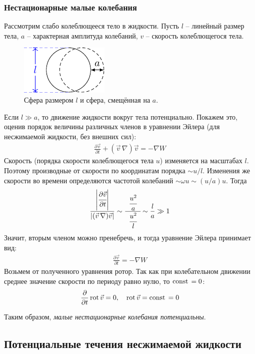\subsubsection{Нестационарные малые колебания}
Рассмотрим слабо колеблющееся тело в жидкости. Пусть $l$ -- линейный размер тела, $a$ -- характерная амплитуда колебаний, $v$ -- скорость колеблющегося тела.
\begin{figure}[H]
	\centering
	\includegraphics[scale=1.5]{img/sphere}
	\caption{Сфера размером $l$ и сфера, смещённая на $a$.}
	\label{fig:figure15}
\end{figure}
Если $l \gg a$, то движение жидкости вокруг тела потенциально. Покажем это, оценив порядок величины различных членов в уравнении Эйлера (для несжимаемой жидкости, без внешних сил):
\begin{align*}
\frac { \partial \vec{v} } { \partial t } + ( \vec{v}\,\nabla ) \vec{v} = - \nabla W
\end{align*}
Скорость (порядка скорости колеблющегося тела $u$) изменяется на  масштабах $l$. Поэтому производные от скорости по координатам порядка $\sim u/l$. Изменения же скорости во времени определяются частотой колебаний $\sim \omega u \sim (u/a)u$. Тогда
\begin{align*}
\frac{
\left| \cfrac { \partial \vec{v} } { \partial t } \right|} {\left| (\vec{v}\,\nabla ) \vec{v} \right|} \sim \cfrac{\phantom{a}\cfrac { u ^ { 2 } } { a }\phantom{a}} { \cfrac { u ^ { 2 } }{ l } } \sim \frac { l } { a } \gg 1
\end{align*}
Значит, вторым членом можно пренебречь, и тогда уравнение Эйлера принимает вид:
\begin{align*}
\frac { \partial \vec{v} } { \partial t } = - \nabla W
\end{align*}
Возьмем от полученного уравнения ротор. Так как при колебательном движении среднее значение скорости по периоду равно нулю, то $\mathrm{const}\,=0$:
\begin{align*}
\pdv{t}  \operatorname{rot}  \vec{v} = 0 , \quad\operatorname{rot}\vec{v} =  \mathrm{const}\,  = 0
\end{align*}


Таким образом, \textit{малые нестационарные колебания потенциальны}.


\subsection{Потенциальные течения несжимаемой жидкости}

